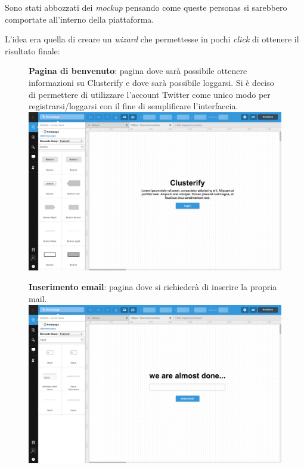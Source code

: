 	Sono stati abbozzati dei \emph{mockup} pensando come queste personas si sarebbero comportate all'interno della piattaforma.

	L'idea era quella di creare un \emph{wizard} che permettesse in pochi \emph{click} di ottenere il risultato finale:

        	\begin{figure}[p]
		\textbf{Pagina di benvenuto}: pagina dove sarà possibile ottenere informazioni su Clusterify e dove sarà possibile loggarsi. Si è deciso di permettere di utilizzare l'account Twitter come unico modo per registrarsi/loggarsi con il fine di semplificare l'interfaccia.\\

        		\includegraphics[width=\textwidth]{img/mockup/welcome.png}
        	\end{figure}

        	\begin{figure}[p]
		\textbf{Inserimento email}: pagina dove si richiederà di inserire la propria mail.\\

        		\includegraphics[width=\textwidth]{img/mockup/email.png}
        	\end{figure}

